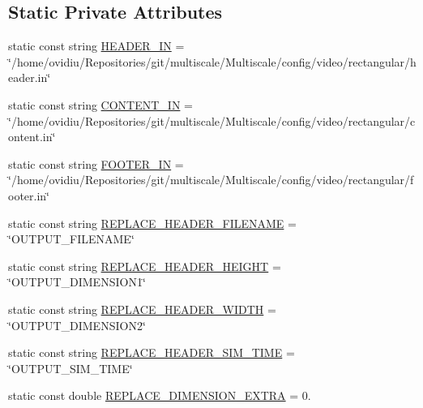 \subsection*{\-Static \-Private \-Attributes}
\begin{DoxyCompactItemize}
\item 
static const string \hyperlink{classmultiscale_1_1video_1_1RectangularGnuplotScriptGenerator_afeced106138e618bb292826093205023}{\-H\-E\-A\-D\-E\-R\-\_\-\-I\-N} = \char`\"{}/home/ovidiu/\-Repositories/git/multiscale/\-Multiscale/config/video/rectangular/header.\-in\char`\"{}
\item 
static const string \hyperlink{classmultiscale_1_1video_1_1RectangularGnuplotScriptGenerator_abbd954ff4d68e2a6ef9a7a81f615892c}{\-C\-O\-N\-T\-E\-N\-T\-\_\-\-I\-N} = \char`\"{}/home/ovidiu/\-Repositories/git/multiscale/\-Multiscale/config/video/rectangular/content.\-in\char`\"{}
\item 
static const string \hyperlink{classmultiscale_1_1video_1_1RectangularGnuplotScriptGenerator_a5bff725c865bc3a426351644cee34229}{\-F\-O\-O\-T\-E\-R\-\_\-\-I\-N} = \char`\"{}/home/ovidiu/\-Repositories/git/multiscale/\-Multiscale/config/video/rectangular/footer.\-in\char`\"{}
\item 
static const string \hyperlink{classmultiscale_1_1video_1_1RectangularGnuplotScriptGenerator_aba834d6608c58a4ea91d73947f2cfe0a}{\-R\-E\-P\-L\-A\-C\-E\-\_\-\-H\-E\-A\-D\-E\-R\-\_\-\-F\-I\-L\-E\-N\-A\-M\-E} = \char`\"{}\-O\-U\-T\-P\-U\-T\-\_\-\-F\-I\-L\-E\-N\-A\-M\-E\char`\"{}
\item 
static const string \hyperlink{classmultiscale_1_1video_1_1RectangularGnuplotScriptGenerator_a7c6bb61b310d321618f22d15f686fd44}{\-R\-E\-P\-L\-A\-C\-E\-\_\-\-H\-E\-A\-D\-E\-R\-\_\-\-H\-E\-I\-G\-H\-T} = \char`\"{}\-O\-U\-T\-P\-U\-T\-\_\-\-D\-I\-M\-E\-N\-S\-I\-O\-N1\char`\"{}
\item 
static const string \hyperlink{classmultiscale_1_1video_1_1RectangularGnuplotScriptGenerator_a2b9a87b266a126d6cdd6d6ee1d707b87}{\-R\-E\-P\-L\-A\-C\-E\-\_\-\-H\-E\-A\-D\-E\-R\-\_\-\-W\-I\-D\-T\-H} = \char`\"{}\-O\-U\-T\-P\-U\-T\-\_\-\-D\-I\-M\-E\-N\-S\-I\-O\-N2\char`\"{}
\item 
static const string \hyperlink{classmultiscale_1_1video_1_1RectangularGnuplotScriptGenerator_a9eaa6120a15c5055eb6fbe5b1113d806}{\-R\-E\-P\-L\-A\-C\-E\-\_\-\-H\-E\-A\-D\-E\-R\-\_\-\-S\-I\-M\-\_\-\-T\-I\-M\-E} = \char`\"{}\-O\-U\-T\-P\-U\-T\-\_\-\-S\-I\-M\-\_\-\-T\-I\-M\-E\char`\"{}
\item 
static const double \hyperlink{classmultiscale_1_1video_1_1RectangularGnuplotScriptGenerator_a90ca6d5bab28ed98c6adf71cb848676e}{\-R\-E\-P\-L\-A\-C\-E\-\_\-\-D\-I\-M\-E\-N\-S\-I\-O\-N\-\_\-\-E\-X\-T\-R\-A} = 0.

\end{DoxyCompactItemize}
